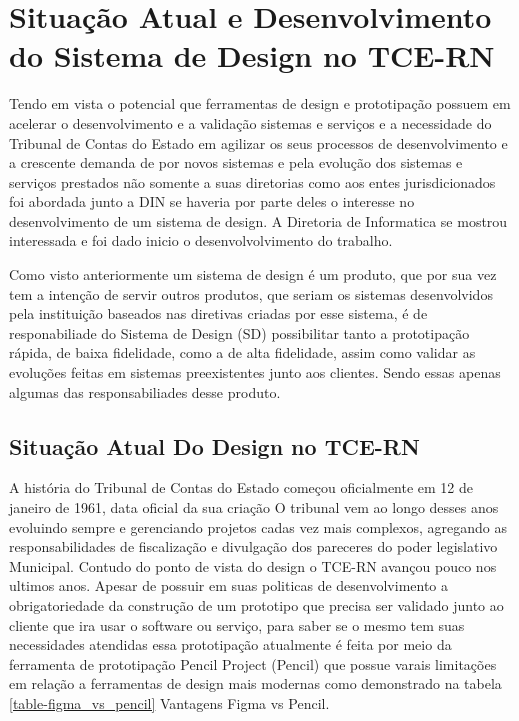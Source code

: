 \chapter[Capítulo 3]{Situação Atual e Desenvolvimento do Sistema de Design no TCE-RN}
\label{ch:cap3}

  Tendo em vista o potencial que ferramentas de design e prototipação possuem em acelerar o desenvolvimento e a validação sistemas e serviços e a necessidade do Tribunal de Contas do Estado em agilizar os seus processos de desenvolvimento e a crescente demanda de por novos sistemas e pela evolução dos sistemas e serviços prestados não somente a suas diretorias como aos entes jurisdicionados foi abordada junto a DIN se haveria por parte deles o interesse no desenvolvimento de um sistema de design. A Diretoria de Informatica se mostrou interessada e foi dado inicio o desenvolvolvimento do trabalho.

  Como visto anteriormente um sistema de design é um produto, que por sua vez tem a intenção de servir outros produtos, que seriam os sistemas desenvolvidos pela instituição baseados nas diretivas criadas por esse sistema, é de responabiliade do Sistema de Design (SD) possibilitar tanto a prototipação rápida, de baixa fidelidade, como a de alta fidelidade, assim como validar as evoluções feitas em sistemas preexistentes junto aos clientes. Sendo essas apenas algumas das responsabiliades desse produto.

\section{Situação Atual Do Design no TCE-RN} \label{secao31}
  A história do Tribunal de Contas do Estado começou oficialmente em 12 de janeiro de 1961, data oficial da sua criação \cite{historia_tribunal} O tribunal vem ao longo desses anos evoluindo sempre e gerenciando projetos cadas vez mais complexos, agregando as responsabilidades de fiscalização e divulgação dos pareceres do poder legislativo Municipal. Contudo do ponto de vista do design o TCE-RN avançou pouco nos ultimos anos. Apesar de possuir em suas politicas de desenvolvimento a obrigatoriedade da construção de um prototipo que precisa ser validado junto ao cliente que ira usar o software ou serviço, para saber se o mesmo tem suas necessidades atendidas essa prototipação atualmente é feita por meio da ferramenta de prototipação Pencil Project (Pencil) que possue varais limitações em relação a ferramentas de design mais modernas como demonstrado na tabela \ref{table-figma_vs_pencil} Vantagens Figma vs Pencil.

